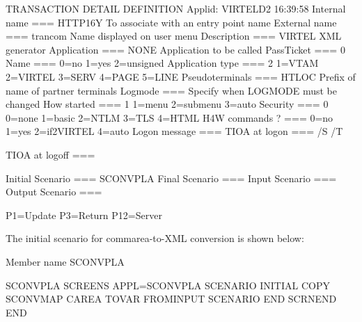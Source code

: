 \documentclass[letterpaper,10pt,english]{sphinxmanual}
\begin{document}
\begin{sphinxVerbatim}[commandchars=\\\{\}]
TRANSACTION DETAIL DEFINITION \PYGZhy{}\PYGZhy{}\PYGZhy{}\PYGZhy{}\PYGZhy{}\PYGZhy{}\PYGZhy{}\PYGZhy{}\PYGZhy{}\PYGZhy{}\PYGZhy{}\PYGZhy{}\PYGZhy{}\PYGZhy{}\PYGZhy{}\PYGZhy{}\PYGZhy{}\PYGZhy{}\PYGZhy{}\PYGZhy{}\PYGZhy{}\PYGZhy{} Applid: VIRTELD2 16:39:58
Internal name ===\PYGZgt{} HTTP\PYGZhy{}16Y               To associate with an entry point name
External name ===\PYGZgt{} trancom                Name displayed on user menu
Description   ===\PYGZgt{} VIRTEL XML generator
Application   ===\PYGZgt{} \PYGZdl{}NONE\PYGZdl{}                 Application to be called
PassTicket   ===\PYGZgt{} 0 Name ===\PYGZgt{}             0=no 1=yes 2=unsigned
Application type ===\PYGZgt{} 2                   1=VTAM 2=VIRTEL 3=SERV 4=PAGE 5=LINE
Pseudo\PYGZhy{}terminals ===\PYGZgt{} HTLOC               Prefix of name of partner terminals
Logmode          ===\PYGZgt{}                     Specify when LOGMODE must be changed
How started      ===\PYGZgt{} 1                   1=menu 2=sub\PYGZhy{}menu 3=auto
Security         ===\PYGZgt{} 0                   0=none 1=basic 2=NTLM 3=TLS 4=HTML
H4W commands ?   ===\PYGZgt{}                     0=no 1=yes 2=if2VIRTEL 4=auto
Logon message    ===\PYGZgt{}
TIOA at logon    ===\PYGZgt{} \PYGZam{}/S \PYGZam{}/T

TIOA at logoff   ===\PYGZgt{}

Initial Scenario ===\PYGZgt{} SCONVPLA         Final Scenario  ===\PYGZgt{}
Input Scenario   ===\PYGZgt{}                  Output Scenario ===\PYGZgt{}

P1=Update                       P3=Return                           P12=Server
\end{sphinxVerbatim}


The initial scenario for commarea-to-XML conversion is shown below:
\label{\detokenize{User_Guide:v457ug-sconvpla}}
\def\sphinxLiteralBlockLabel{\label{\detokenize{User_Guide:v457ug-sconvpla}}}
\begin{sphinxVerbatim}[commandchars=\\\{\}]
Member name SCONVPLA

SCONVPLA SCREENS APPL=SCONVPLA
SCENARIO INITIAL
COPY SCONVMAP
CAREA TOVAR\PYGZdl{} FROM\PYGZhy{}INPUT
SCENARIO END
SCRNEND
END
\end{sphinxVerbatim}
\let\sphinxLiteralBlockLabel\empty
\end{document}
